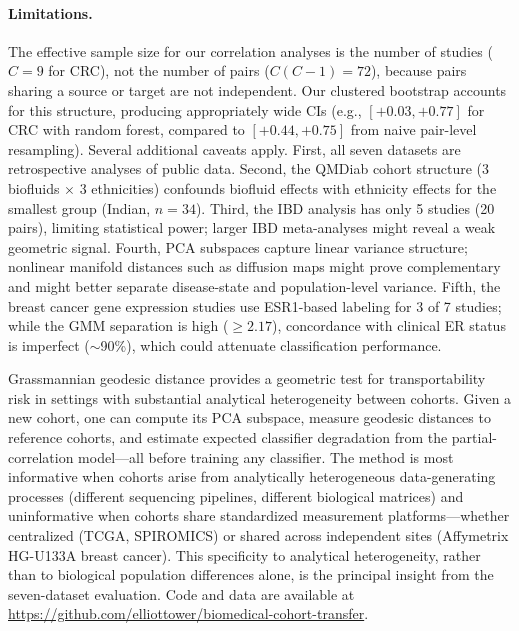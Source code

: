 \documentclass{article}
\begin{document}
\paragraph{Limitations.} The effective sample size for our correlation analyses is the number of studies ($C = 9$ for CRC), not the number of pairs ($C(C-1) = 72$), because pairs sharing a source or target are not independent. Our clustered bootstrap accounts for this structure, producing appropriately wide CIs (e.g., $[+0.03, +0.77]$ for CRC with random forest, compared to $[+0.44, +0.75]$ from naive pair-level resampling). Several additional caveats apply. First, all seven datasets are retrospective analyses of public data. Second, the QMDiab cohort structure (3 biofluids $\times$ 3 ethnicities) confounds biofluid effects with ethnicity effects for the smallest group (Indian, $n = 34$). Third, the IBD analysis has only 5 studies (20 pairs), limiting statistical power; larger IBD meta-analyses might reveal a weak geometric signal. Fourth, PCA subspaces capture linear variance structure; nonlinear manifold distances such as diffusion maps \citep{conway1996functions} might prove complementary and might better separate disease-state and population-level variance. Fifth, the breast cancer gene expression studies use ESR1-based labeling for 3 of 7 studies; while the GMM separation is high ($\geq 2.17$), concordance with clinical ER status is imperfect ($\sim$90\%), which could attenuate classification performance.

Grassmannian geodesic distance provides a geometric test for transportability risk in settings with substantial analytical heterogeneity between cohorts. Given a new cohort, one can compute its PCA subspace, measure geodesic distances to reference cohorts, and estimate expected classifier degradation from the partial-correlation model---all before training any classifier. The method is most informative when cohorts arise from analytically heterogeneous data-generating processes (different sequencing pipelines, different biological matrices) and uninformative when cohorts share standardized measurement platforms---whether centralized (TCGA, SPIROMICS) or shared across independent sites (Affymetrix HG-U133A breast cancer). This specificity to analytical heterogeneity, rather than to biological population differences alone, is the principal insight from the seven-dataset evaluation. Code and data are available at \url{https://github.com/elliottower/biomedical-cohort-transfer}.



\end{document}
